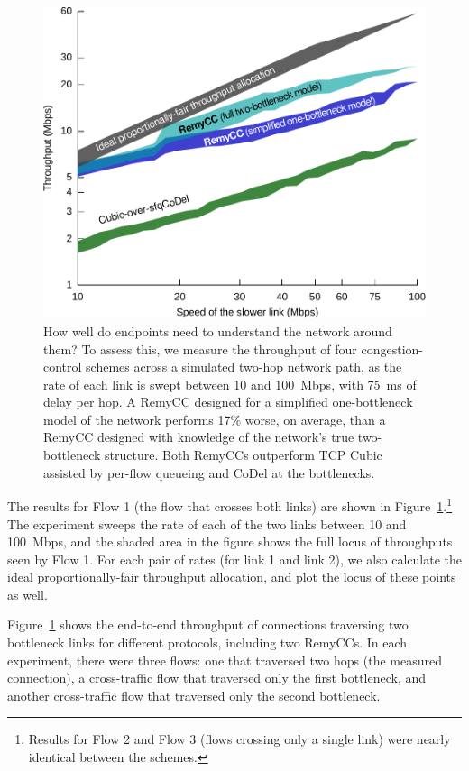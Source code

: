 \begin{figure}[t!]
\includegraphics[width=\columnwidth]{multilink-all.pdf}
\caption{How well do endpoints need to understand the network around
  them? To assess this, we measure the throughput of four
  congestion-control schemes across a simulated two-hop network path,
  as the rate of each link is swept between 10 and 100~Mbps, with
  75~ms of delay per hop. A RemyCC designed for a simplified
  one-bottleneck model of the network performs 17\% worse, on average,
  than a RemyCC designed with knowledge of the network's true
  two-bottleneck structure. Both RemyCCs outperform TCP Cubic assisted
  by per-flow queueing and CoDel at the bottlenecks.}
\label{f:multihop}
\end{figure}

The results for Flow 1 (the flow that crosses both links) are shown in
Figure~\ref{f:multihop}.\footnote{Results for Flow 2 and Flow 3
  (flows crossing only a single link) were nearly identical between
  the schemes.} The experiment sweeps the rate of each of the two
links between 10 and 100~Mbps, and the shaded area in the figure shows
the full locus of throughputs seen by Flow 1. For each pair of rates
(for link 1 and link 2), we also calculate the ideal
proportionally-fair throughput allocation, and plot the locus of these
points as well.

Figure~\ref{f:multihop} shows the end-to-end throughput of connections
traversing two bottleneck links for different protocols, including two
RemyCCs. In each experiment, there were three flows: one that
traversed two hops (the measured connection), a cross-traffic flow
that traversed only the first bottleneck, and another cross-traffic
flow that traversed only the second bottleneck.

